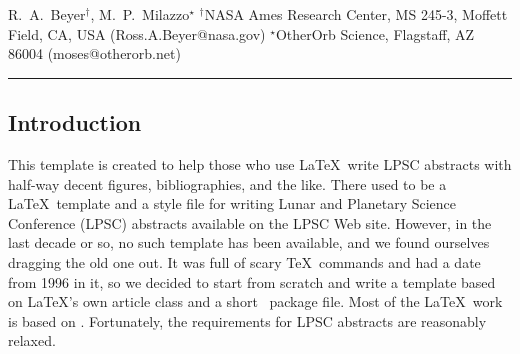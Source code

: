 \documentclass[twoside]{article}
\begin{document}

{R.~A.~Beyer$^{\dag}$, M.~P.~Milazzo$^{\star}$ $^{\dag}$NASA Ames Research Center, MS 245-3, Moffett Field, CA, USA (Ross.A.Beyer@nasa.gov) $^{\star}$OtherOrb Science, Flagstaff, AZ 86004 (moses@otherorb.net) \\ \hrule
} 

%

%


\balance



\subsection*{Introduction} This template is created to help those who use
\LaTeX\ write LPSC abstracts with half-way decent figures, bibliographies, 
and the like. There used to be a \LaTeX\ template and a style file for writing
Lunar and Planetary Science Conference (LPSC) abstracts available
on the LPSC Web site.  However, in the last decade or so, no
such template has been available, and we found ourselves dragging
the old one out.  It was full of scary \TeX\ commands and had a
date from 1996 in it, so we decided to start from scratch and write
a template based on \LaTeX's own article class and a short \LaTeXe\
package file.  Most of the \LaTeX\ work is based on \citep{kopka2003guide}.
Fortunately, the requirements for LPSC abstracts \citep{LPSC} are
reasonably relaxed.
\end{document}
